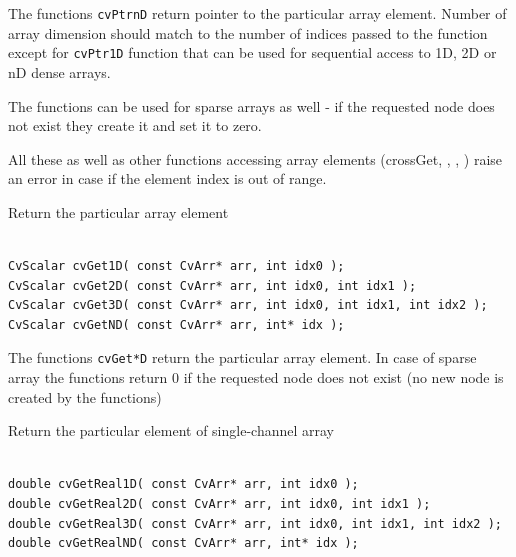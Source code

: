 The functions \texttt{cvPtrnD} return pointer to the particular array element. Number of array dimension should match to the number of indices passed to the function except for \texttt{cvPtr1D} function that can be used for sequential access to 1D, 2D or nD dense arrays.

The functions can be used for sparse arrays as well - if the requested node does not exist they create it and set it to zero.

All these as well as other functions accessing array elements (cross{Get}, , , ) raise an error in case if the element index is out of range.

\label{Get*D}

Return the particular array element

\begin{lstlisting}

CvScalar cvGet1D( const CvArr* arr, int idx0 );
CvScalar cvGet2D( const CvArr* arr, int idx0, int idx1 );
CvScalar cvGet3D( const CvArr* arr, int idx0, int idx1, int idx2 );
CvScalar cvGetND( const CvArr* arr, int* idx );

\end{lstlisting}

\begin{description}
\end{description}


The functions \texttt{cvGet*D} return the particular array element. In case of sparse array the functions return 0 if the requested node does not exist (no new node is created by the functions)

\label{GetReal*D}

Return the particular element of single-channel array

\begin{lstlisting}

double cvGetReal1D( const CvArr* arr, int idx0 );
double cvGetReal2D( const CvArr* arr, int idx0, int idx1 );
double cvGetReal3D( const CvArr* arr, int idx0, int idx1, int idx2 );
double cvGetRealND( const CvArr* arr, int* idx );

\end{lstlisting}

